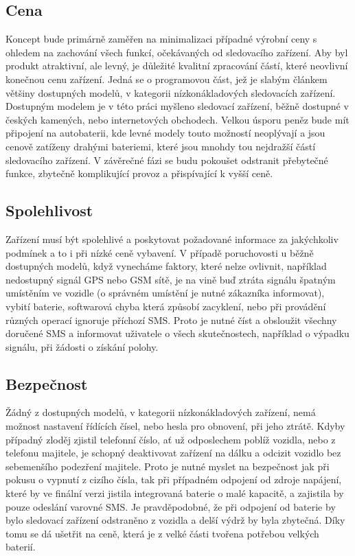 \documentclass[FM,MP]{tulthesis}  %
\begin{document}
\subsection{Cena}
Koncept bude primárně zaměřen na minimalizaci případné výrobní ceny s ohledem na zachování všech funkcí, očekávaných od sledovacího zařízení. Aby byl produkt atraktivní, ale levný, je důležité kvalitní zpracování částí, které neovlivní konečnou cenu zařízení. Jedná se o programovou část, jež je slabým článkem většiny dostupných modelů, v kategorii nízkonákladových sledovacích zařízení. Dostupným modelem je v této práci myšleno sledovací zařízení, běžně dostupné v českých kamených, nebo internetových obchodech. Velkou úsporu peněz bude mít připojení na autobaterii, kde levné modely touto možností neoplývají a jsou cenově zatíženy drahými bateriemi, které jsou mnohdy tou nejdražší částí sledovacího zařízení. V závěrečné fázi se budu pokoušet odstranit přebytečné funkce, zbytečně komplikující provoz a přispívající k vyšší ceně.

\subsection{Spolehlivost}
Zařízení musí být spolehlivé a poskytovat požadované informace za jakýchkoliv podmínek a to i při nízké ceně vybavení. V případě poruchovosti u běžně dostupných modelů, když vynecháme faktory, které nelze ovlivnit, například nedostupný signál GPS nebo GSM sítě, je na vině buď ztráta signálu špatným umístěním ve vozidle (o správném umístění je nutné zákazníka informovat), vybití baterie, softwarová chyba která způsobí zacyklení, nebo při provádění různých operací ignoruje příchozí SMS. Proto je nutné číst a obsloužit všechny doručené SMS a informovat uživatele o všech skutečnostech, například o výpadku signálu, při žádosti o získání polohy.

\subsection{Bezpečnost}
Žádný z dostupných modelů, v kategorii nízkonákladových zařízení, nemá možnost nastavení řídících čísel, nebo hesla pro obnovení, při jeho ztrátě. Kdyby případný zloděj zjistil telefonní číslo, ať už odposlechem poblíž vozidla, nebo z telefonu majitele, je schopný deaktivovat zařízení na dálku a odcizit vozidlo bez sebemenšího podezření majitele. Proto je nutné myslet na bezpečnost jak při pokusu o vypnutí z cizího čísla, tak při případném odpojení od zdroje napájení, které by ve finální verzi jistila integrovaná baterie o malé kapacitě, a zajistila by pouze odeslání varovné SMS. Je pravděpodobné, že při odpojení od baterie by bylo sledovací zařízení odstraněno z vozidla a delší výdrž by byla zbytečná. Díky tomu se dá ušetřit na ceně, která je z velké části tvořena potřebou velkých baterií.
\end{document}
